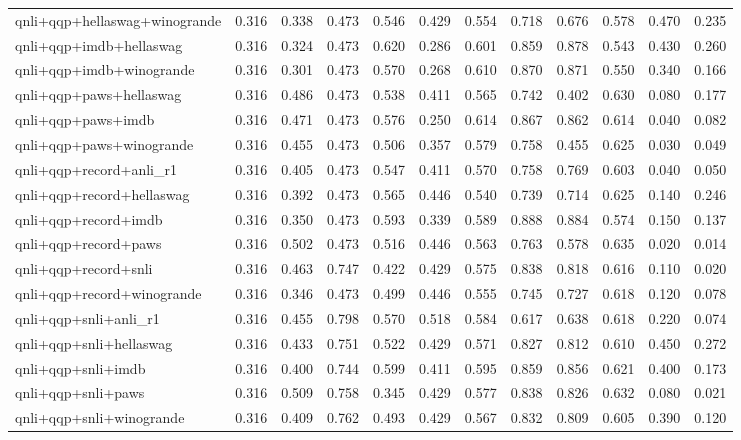 \begin{table}[t]
\begin{tabular}{lrrrrrrrrrrr}
    qnli+qqp+hellaswag+winogrande & 0.316 & 0.338 & 0.473 & 0.546 & 0.429 & 0.554 & 0.718 & 0.676 & 0.578 & 0.470 & 0.235 \\
    qnli+qqp+imdb+hellaswag & 0.316 & 0.324 & 0.473 & 0.620 & 0.286 & 0.601 & 0.859 & 0.878 & 0.543 & 0.430 & 0.260 \\
    qnli+qqp+imdb+winogrande & 0.316 & 0.301 & 0.473 & 0.570 & 0.268 & 0.610 & 0.870 & 0.871 & 0.550 & 0.340 & 0.166 \\
    qnli+qqp+paws+hellaswag & 0.316 & 0.486 & 0.473 & 0.538 & 0.411 & 0.565 & 0.742 & 0.402 & 0.630 & 0.080 & 0.177 \\
    qnli+qqp+paws+imdb & 0.316 & 0.471 & 0.473 & 0.576 & 0.250 & 0.614 & 0.867 & 0.862 & 0.614 & 0.040 & 0.082 \\
    qnli+qqp+paws+winogrande & 0.316 & 0.455 & 0.473 & 0.506 & 0.357 & 0.579 & 0.758 & 0.455 & 0.625 & 0.030 & 0.049 \\
    qnli+qqp+record+anli\_r1 & 0.316 & 0.405 & 0.473 & 0.547 & 0.411 & 0.570 & 0.758 & 0.769 & 0.603 & 0.040 & 0.050 \\
    qnli+qqp+record+hellaswag & 0.316 & 0.392 & 0.473 & 0.565 & 0.446 & 0.540 & 0.739 & 0.714 & 0.625 & 0.140 & 0.246 \\
    qnli+qqp+record+imdb & 0.316 & 0.350 & 0.473 & 0.593 & 0.339 & 0.589 & 0.888 & 0.884 & 0.574 & 0.150 & 0.137 \\
    qnli+qqp+record+paws & 0.316 & 0.502 & 0.473 & 0.516 & 0.446 & 0.563 & 0.763 & 0.578 & 0.635 & 0.020 & 0.014 \\
    qnli+qqp+record+snli & 0.316 & 0.463 & 0.747 & 0.422 & 0.429 & 0.575 & 0.838 & 0.818 & 0.616 & 0.110 & 0.020 \\
    qnli+qqp+record+winogrande & 0.316 & 0.346 & 0.473 & 0.499 & 0.446 & 0.555 & 0.745 & 0.727 & 0.618 & 0.120 & 0.078 \\
    qnli+qqp+snli+anli\_r1 & 0.316 & 0.455 & 0.798 & 0.570 & 0.518 & 0.584 & 0.617 & 0.638 & 0.618 & 0.220 & 0.074 \\
    qnli+qqp+snli+hellaswag & 0.316 & 0.433 & 0.751 & 0.522 & 0.429 & 0.571 & 0.827 & 0.812 & 0.610 & 0.450 & 0.272 \\
    qnli+qqp+snli+imdb & 0.316 & 0.400 & 0.744 & 0.599 & 0.411 & 0.595 & 0.859 & 0.856 & 0.621 & 0.400 & 0.173 \\
    qnli+qqp+snli+paws & 0.316 & 0.509 & 0.758 & 0.345 & 0.429 & 0.577 & 0.838 & 0.826 & 0.632 & 0.080 & 0.021 \\
    qnli+qqp+snli+winogrande & 0.316 & 0.409 & 0.762 & 0.493 & 0.429 & 0.567 & 0.832 & 0.809 & 0.605 & 0.390 & 0.120 \\

\end{tabular}
\end{table}
